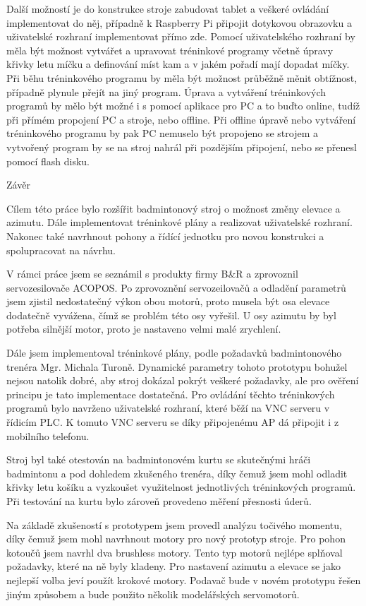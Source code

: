 Další možností je do konstrukce stroje zabudovat tablet a veškeré ovládání implementovat do něj, případně k Raspberry Pi připojit dotykovou obrazovku a uživatelské rozhraní implementovat přímo zde.
\nl
\nl
Pomocí uživatelského rozhraní by měla být možnost vytvářet a upravovat tréninkové programy včetně úpravy křivky letu míčku a definování míst kam a v jakém pořadí mají dopadat míčky. Při běhu tréninkového programu by měla být možnost průběžně měnit obtížnost, případně plynule přejít na jiný program. 
\nl
\nl
Úprava a vytváření tréninkových programů by mělo být možné i s pomocí aplikace pro PC a to buďto online, tudíž při přímém propojení PC a stroje, nebo offline. Při offline úpravě nebo vytváření tréninkového programu by pak PC nemuselo být propojeno se strojem a vytvořený program by se na stroj nahrál při pozdějším připojení, nebo se přenesl pomocí flash disku. 


\chap Závěr

Cílem této práce bylo rozšířit badmintonový stroj o možnost změny elevace a azimutu. Dále implementovat tréninkové plány a realizovat uživatelské rozhraní. Nakonec také navrhnout pohony a řídící jednotku pro novou konstrukci a spolupracovat na návrhu.

V rámci práce jsem se seznámil s produkty firmy B\&R a zprovoznil servozesilovače ACOPOS. Po zprovoznění servozeilovačů a odladění parametrů jsem zjistil nedostatečný výkon obou motorů, proto musela být osa elevace dodatečně vyvážena, čímž se problém této osy vyřešil. U osy azimutu by byl potřeba silnější motor, proto je nastaveno velmi malé zrychlení. 

Dále jsem implementoval tréninkové plány, podle požadavků badmintonového trenéra Mgr. Michala Turoně. Dynamické parametry tohoto prototypu bohužel nejsou natolik dobré, aby stroj dokázal pokrýt veškeré požadavky, ale pro ověření principu je tato implementace dostatečná. Pro ovládání těchto tréninkových programů bylo navrženo uživatelské rozhraní, které běží na VNC serveru v řídicím PLC. K tomuto VNC serveru se díky připojenému AP dá připojit i z mobilního telefonu. 

Stroj byl také otestován na badmintonovém kurtu se skutečnými hráči badmintonu a pod dohledem zkušeného trenéra, díky čemuž jsem mohl odladit křivky letu košíku a vyzkoušet využitelnost jednotlivých tréninkových programů. Při testování na kurtu bylo zároveň provedeno měření přesnosti úderů.

Na základě zkušeností s prototypem jsem provedl analýzu točivého momentu, díky čemuž jsem mohl navrhnout motory pro nový prototyp stroje. Pro pohon kotoučů jsem navrhl dva brushless motory. Tento typ motorů nejlépe splňoval požadavky, které na ně byly kladeny. Pro nastavení azimutu a elevace se jako nejlepší volba jeví použít krokové motory. Podavač bude v novém prototypu řešen jiným způsobem a bude použito několik modelářských servomotorů.

